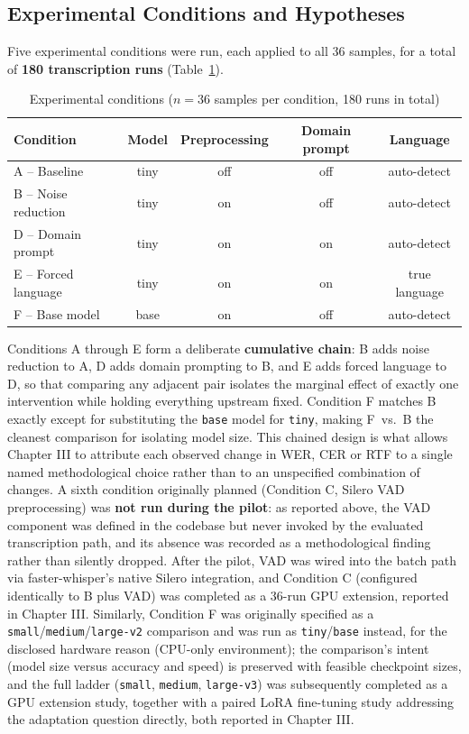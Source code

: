 \documentclass[12pt]{report}
\begin{document}
\subsection{Experimental Conditions and Hypotheses}
Five experimental conditions were run, each applied to all 36 samples, for a total of \textbf{180 transcription runs} (Table~\ref{tab:conditions}).
\begin{table}[H]
\centering
\small
\begin{tabular}{|l|c|c|c|c|}
\hline
\textbf{Condition} & \textbf{Model} & \textbf{Preprocessing} & \textbf{Domain prompt} & \textbf{Language} \\ \hline
A -- Baseline & tiny & off & off & auto-detect \\ \hline
B -- Noise reduction & tiny & on & off & auto-detect \\ \hline
D -- Domain prompt & tiny & on & on & auto-detect \\ \hline
E -- Forced language & tiny & on & on & true language \\ \hline
F -- Base model & base & on & off & auto-detect \\ \hline
\end{tabular}
\caption{Experimental conditions ($n=36$ samples per condition, 180 runs in total)}
\label{tab:conditions}
\end{table}
Conditions A through E form a deliberate \textbf{cumulative chain}: B adds noise reduction to A, D adds domain prompting to B, and E adds forced language to D, so that comparing any adjacent pair isolates the marginal effect of exactly one intervention while holding everything upstream fixed. Condition F matches B exactly except for substituting the \texttt{base} model for \texttt{tiny}, making F~vs.~B the cleanest comparison for isolating model size. This chained design is what allows Chapter III to attribute each observed change in WER, CER or RTF to a single named methodological choice rather than to an unspecified combination of changes.
A sixth condition originally planned (Condition C, Silero VAD preprocessing) was \textbf{not run during the pilot}: as reported above, the VAD component was defined in the codebase but never invoked by the evaluated transcription path, and its absence was recorded as a methodological finding rather than silently dropped. After the pilot, VAD was wired into the batch path via faster-whisper's native Silero integration, and Condition C (configured identically to B plus VAD) was completed as a 36-run GPU extension, reported in Chapter III. Similarly, Condition F was originally specified as a \texttt{small}/\texttt{medium}/\texttt{large-v2} comparison and was run as \texttt{tiny}/\texttt{base} instead, for the disclosed hardware reason (CPU-only environment); the comparison's intent (model size versus accuracy and speed) is preserved with feasible checkpoint sizes, and the full ladder (\texttt{small}, \texttt{medium}, \texttt{large-v3}) was subsequently completed as a GPU extension study, together with a paired LoRA fine-tuning study addressing the adaptation question directly, both reported in Chapter III.
\end{document}
